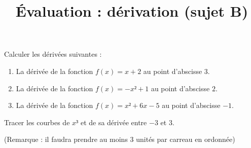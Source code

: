 \documentclass[
	classe=$1^{ere}STI2D$,
]{évaluation}
\begin{document}
\newpage
\setcounter{exercice}{1}

\title{Évaluation : dérivation (sujet B)}
\maketitle

\begin{exercice}
	Calculer les dérivées suivantes :
	\begin{enumerate}
		\item La dérivée de la fonction $f(x) = x + 2$ au point d'abscisse $3$.
		\item La dérivée de la fonction $f(x) = -x² + 1$ au point d'abscisse $2$.
		\item La dérivée de la fonction $f(x) = x² + 6x - 5$ au point d'abscisse $-1$.
	\end{enumerate}
\end{exercice}

\begin{exercice}
	Tracer les courbes de $x³$ et de sa dérivée entre $-3$ et $3$.

	(Remarque : il faudra prendre au moins $3$ unités par carreau en ordonnée)

\end{exercice}
\end{document}

